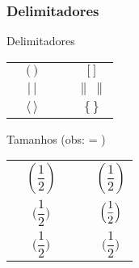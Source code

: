 \begin{frame}
   \frametitle{Delimitadores}
  \begin{block}{Delimitadores}
    \centering
    \begin{tabular}{lcllc}
      \blue{\texttt{( )}} & $\bigl(\,\bigr)$ &&
      \blue{\texttt{[ ]}} & $\bigl[\, \bigr]$ \\[2mm]
      \blue{\texttt{\string| \string|}} & $\bigl|\,\bigr|$ &&
      \blue{\texttt{\string\| \string\|}} & $\bigl\|\, \bigr\|$ \\[2mm]
      \blue{\texttt{\string\langle\ \string\rangle}} & $\bigl\langle\,\bigr\rangle$ &&
      \blue{\texttt{\string\lbrace\ \string\rbrace}} & $\bigl\lbrace\,\bigr\rbrace$
    \end{tabular}
  \end{block}

  \def\x{\dfrac12}

  \begin{block}{Tamanhos \hfill (obs: \texttt{\string\x} = \texttt{\string{}})}
    \centering
    \begin{tabular}{lcllc}
      \blue{\texttt{(\ \black{\string\x}\ )}} & $( \x )$ &&
      \blue{\texttt{\string\left(\ \black{\string\x}\ \string\right)}} & $\left( \x \right)$  \\
      \blue{\texttt{\string\bigl(\ \black{\string\x}\ \string\bigr)}} & $\bigl( \x \bigr)$ &&
      \blue{\texttt{\string\Bigl(\ \black{\string\x}\ \string\Bigr)}} & $\Bigl( \x \Bigr)$ \\
      \blue{\texttt{\string\biggl(\ \black{\string\x}\ \string\biggr)}} & $\biggl( \x \biggr)$ &&
      \blue{\texttt{\string\Biggl(\ \black{\string\x}\ \string\Biggr)}} & $\Biggl( \x \Biggr)$
    \end{tabular}
  \end{block}
\end{frame}

